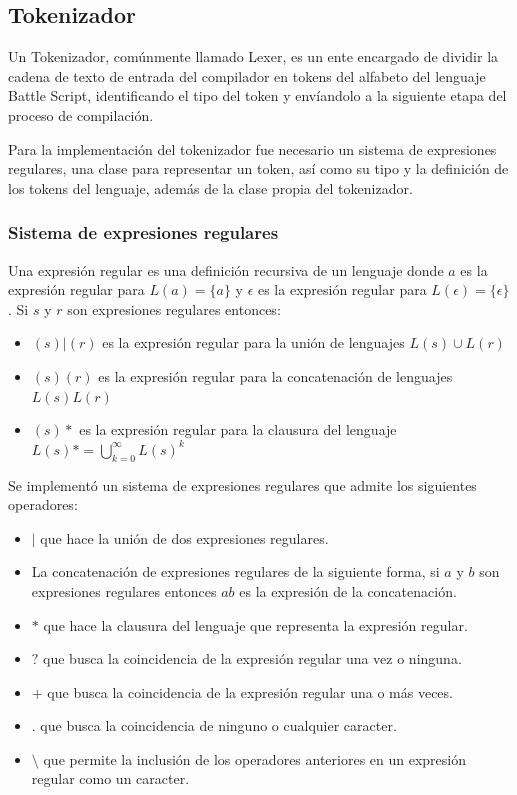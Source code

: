 \subsection{Tokenizador}

Un Tokenizador, comúnmente llamado Lexer, es un ente encargado de dividir la cadena de texto de entrada del compilador en tokens del alfabeto del lenguaje Battle Script, identificando el tipo del token y envíandolo a la siguiente etapa del proceso de compilación.

Para la implementación del tokenizador fue necesario un sistema de expresiones regulares, una clase para representar un token, así como su tipo y la definición de los tokens del lenguaje, además de la clase propia del tokenizador. 

\subsubsection{Sistema de expresiones regulares}

Una expresión regular es una definición recursiva de un lenguaje donde $a$ es la expresión regular para $L(a) = \{a\}$ y $\epsilon$ es la expresión regular para $L(\epsilon) = \{\epsilon\}$. Si $s$ y $r$ son expresiones regulares entonces:

\begin{itemize}
    \item $(s)|(r)$ es la expresión regular para la unión de lenguajes $L(s) \cup L(r)$
    \item $(s)(r)$ es la expresión regular para la concatenación de lenguajes $L(s)L(r)$
    \item $(s)*$ es la expresión regular para la clausura del lenguaje $L(s)* = \bigcup\limits_{k=0}^{\infty} L(s)^k$
\end{itemize}

Se implementó un sistema de expresiones regulares que admite los siguientes operadores:

\begin{itemize}
    \item $|$ que hace la unión de dos expresiones regulares.
    \item La concatenación de expresiones regulares de la siguiente forma, si $a$ y $b$ son expresiones regulares entonces $ab$ es la expresión de la concatenación.
    \item $*$ que hace la clausura del lenguaje que representa la expresión regular.
    \item $?$ que busca la coincidencia de la expresión regular una vez o ninguna.
    \item $+$ que busca la coincidencia de la expresión regular una o más veces.
    \item $.$ que busca la coincidencia de ninguno o cualquier caracter.
    \item $\setminus$  que permite la inclusión de los operadores anteriores en un expresión regular como un caracter.
\end{itemize}

